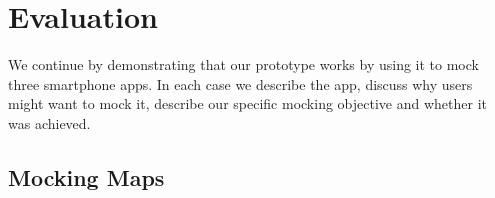 \section{Evaluation}
\label{sec-evaluation}

We continue by demonstrating that our \PocketMocker{} prototype works by using
it to mock three smartphone apps. In each case we describe the app, discuss why
users might want to mock it, describe our specific mocking objective and
whether it was achieved.

\subsection{Mocking Maps}

\begin{figure}[t]


\end{figure}
